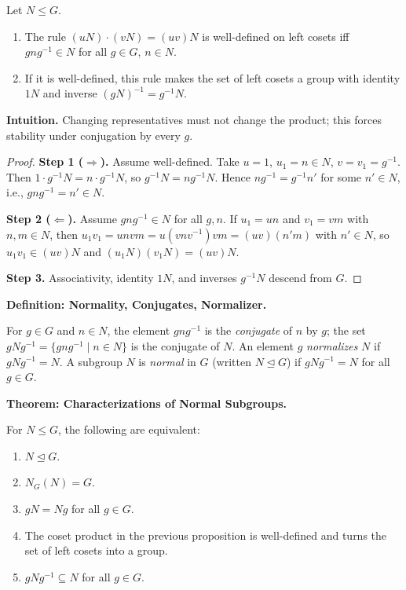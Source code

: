\documentclass[9pt]{article}
\theoremstyle{definition}
\begin{document}
Let $N\le G$.
\begin{enumerate}
  \item The rule $(uN)\cdot(vN)=(uv)N$ is well-defined on left cosets iff $gng^{-1}\in N$ for all $g\in G$, $n\in N$.
  \item If it is well-defined, this rule makes the set of left cosets a group with identity $1N$ and inverse $(gN)^{-1}=g^{-1}N$.
\end{enumerate}

\dotfill

\noindent\textbf{Intuition.}
Changing representatives must not change the product; this forces stability under conjugation by every $g$.

\dotfill

\begin{proof}
\textbf{Step 1 ($\Rightarrow$).} Assume well-defined. Take $u=1$, $u_1=n\in N$, $v=v_1=g^{-1}$. Then $1\cdot g^{-1}N = n\cdot g^{-1}N$, so $g^{-1}N=ng^{-1}N$. Hence $ng^{-1}=g^{-1}n'$ for some $n'\in N$, i.e., $gng^{-1}=n'\in N$.

\textbf{Step 2 ($\Leftarrow$).} Assume $gng^{-1}\in N$ for all $g,n$. If $u_1=un$ and $v_1=vm$ with $n,m\in N$, then
$u_1v_1=unvm=u(vnv^{-1})vm=(uv)(n'm)$ with $n'\in N$, so $u_1v_1\in(uv)N$ and $(u_1N)(v_1N)=(uv)N$.

\textbf{Step 3.} Associativity, identity $1N$, and inverses $g^{-1}N$ descend from $G$.
\end{proof}

\newpage

\noindent\textbf{Definition: Normality, Conjugates, Normalizer.}

\newpage

For $g\in G$ and $n\in N$, the element $gng^{-1}$ is the \emph{conjugate} of $n$ by $g$; the set $gNg^{-1}=\{gng^{-1}\mid n\in N\}$ is the conjugate of $N$. An element $g$ \emph{normalizes} $N$ if $gNg^{-1}=N$. A subgroup $N$ is \emph{normal} in $G$ (written $N\trianglelefteq G$) if $gNg^{-1}=N$ for all $g\in G$.

\newpage

\noindent\textbf{Theorem: Characterizations of Normal Subgroups.}

\newpage

For $N\le G$, the following are equivalent:
\begin{enumerate}
  \item $N\trianglelefteq G$.
  \item $N_G(N)=G$.
  \item $gN=Ng$ for all $g\in G$.
  \item The coset product in the previous proposition is well-defined and turns the set of left cosets into a group.
  \item $gNg^{-1}\subseteq N$ for all $g\in G$.
\end{enumerate}
\end{document}
